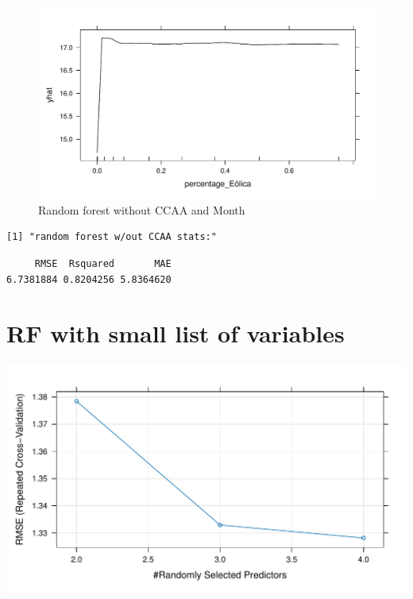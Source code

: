 \documentclass[
]{report}
\begin{document}
\begin{figure}

{\centering \includegraphics{Modelling_Energy_Intensity-V3_files/figure-pdf/unnamed-chunk-6-5.pdf}

}

\caption{Random forest without CCAA and Month}

\end{figure}

\begin{verbatim}
[1] "random forest w/out CCAA stats:"
\end{verbatim}

\begin{verbatim}
     RMSE  Rsquared       MAE 
6.7381884 0.8204256 5.8364620 
\end{verbatim}

\hypertarget{rf-with-small-list-of-variables}{%
\section{RF with small list of
variables}\label{rf-with-small-list-of-variables}}

\includegraphics{Modelling_Energy_Intensity-V3_files/figure-pdf/unnamed-chunk-8-1.pdf}
\end{document}
